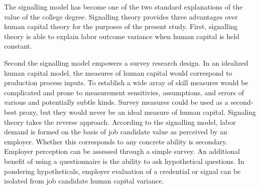 \documentclass[review]{elsarticle}
\begin{document}


The signalling model has become one of the two standard explanations of the value of the college degree.
Signalling theory provides three advantages over human capital theory for the purposes of the present study.
First, signalling theory is able to explain labor outcome variance when human capital is held constant.

Second the signalling model empowers a survey research design.
In an idealized human capital model, the measures of human capital would correspond to production process inputs.
To establish a wide array of skill measures would be complicated and prone to measurement sensitivies, assumptions, and errors of various and potentially subtle kinds.
Survey measures could be used as a second-best proxy, but they would never be an ideal measure of human capital.
Signaling theory takes the reverse approach.
According to the signalling model, labor demand is formed on the basis of job candidate value as perceived by an employer.
Whether this corresponds to any concrete ability is secondary.
Employer perception can be assessed through a simple survey.
An additional benefit of using a questionnaire is the ability to ask hypothetical questions.
In pondering hypotheticals, employer evaluation of a credential or signal can be isolated from job candidate human capital variance.
\end{document}
